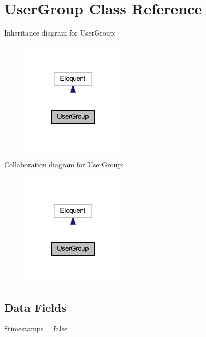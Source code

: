 \hypertarget{class_user_group}{}\section{User\+Group Class Reference}
\label{class_user_group}


Inheritance diagram for User\+Group\+:
\nopagebreak
\begin{figure}[H]
\begin{center}
\leavevmode
\includegraphics[width=143pt]{class_user_group__inherit__graph}
\end{center}
\end{figure}


Collaboration diagram for User\+Group\+:
\nopagebreak
\begin{figure}[H]
\begin{center}
\leavevmode
\includegraphics[width=143pt]{class_user_group__coll__graph}
\end{center}
\end{figure}
\subsection*{Data Fields}
\begin{DoxyCompactItemize}
\item 
\hyperlink{class_user_group_a51267c24c8fae742ed8f9be0ba6085ee}{\$timestamps} = false
\end{DoxyCompactItemize}
